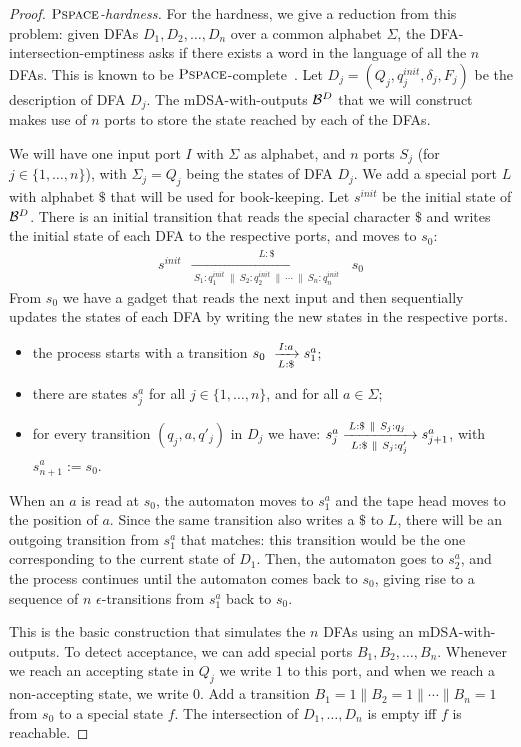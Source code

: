 \begin{proof}
    \emph{$\operatorname{\textsc{Pspace}}$-hardness.} For the hardness, we give a reduction from this problem: given DFAs $D_1, D_2, \dots, D_n$ over a common alphabet $\Sigma$, the DFA-intersection-emptiness asks if there exists a word in the language of all the $n$ DFAs. This is known to be $\operatorname{\textsc{Pspace}}$-complete~\cite{10.1109/SFCS.1977.16}. Let $D_j = (Q_j, q^{init}_j, \delta_j, F_j)$ be the description of DFA $D_j$. The mDSA-with-outputs $\mathcal{B}^D$ that we will construct makes use of $n$ ports to store the state reached by each of the DFAs.

    We will have one input port $I$ with $\Sigma$ as alphabet, and $n$ ports $S_j$ (for $j \in \{1, \dots, n\}$), with $\Sigma_j = Q_j$ being the states of DFA $D_j$. We add a special port $L$ with alphabet $\$$ that will be used for book-keeping. Let $s^{init}$ be the initial state of $\mathcal{B}^D$. There is an initial transition that reads the special character $\$$ and writes the initial state of each DFA to the respective ports, and moves to $s_0$:
    \begin{align*}
    s^{init}~~ \xrightarrow[~S_1: q^{init}_1 ~\parallel~ S_2: q^{init}_2 ~\parallel~ \cdots ~\parallel~ S_n: q^{init}_n~]{L: \$} ~~s_0
    \end{align*}
    From $s_0$ we have a gadget that reads the next input and then sequentially updates the states of each DFA by writing the new states in the respective ports. 
    \begin{itemize}
        \item the process starts with a transition $s_0~\xrightarrow[L:\$]{I:a} s^a_1$; 
        \item there are states $s^a_{j}$ for all $j \in \{1, \dots, n\}$, and for all $a \in \Sigma$;
        \item for every transition $(q_j, a, q'_j)$ in $D_j$ we have: $s^a_j \xrightarrow[~L:\$~\parallel~S_j: q'_j~]{L:\$ ~\parallel~ S_j: q_j~} s^a_{j+1}$, with $s^a_{n+1} := s_0$.
    \end{itemize}
    When an $a$ is read at $s_0$, the automaton moves to $s^a_1$ and the tape head moves to the position of $a$. Since the same transition also writes a $\$$ to $L$, there will be an outgoing transition from $s^a_1$ that matches: this transition would be the one corresponding to the current state of $D_1$. Then, the automaton goes to $s^a_2$, and the process continues until the automaton comes back to $s_0$, giving rise to a sequence of $n$ $\epsilon$-transitions from $s^a_1$ back to $s_0$. 

    This is the basic construction that simulates the $n$ DFAs using an mDSA-with-outputs. To detect acceptance, we can add special ports $B_1, B_2, \dots, B_n$. Whenever we reach an accepting state in $Q_j$ we write $1$ to this port, and when we reach a non-accepting state, we write $0$. Add a transition $B_1 = 1 \parallel B_2 = 1 \parallel \cdots \parallel B_n = 1$ from $s_0$ to a special state $f$. The intersection of $D_1, \dots, D_n$ is empty iff $f$ is reachable.


\end{proof}
